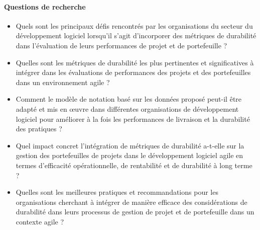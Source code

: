 \paragraph{Questions de recherche}
\begin{itemize}
    \item Quels sont les principaux défis rencontrés par les organisations du secteur du développement logiciel lorsqu'il s'agit d'incorporer des métriques de durabilité dans l'évaluation de leurs performances de projet et de portefeuille ?
    \item Quelles sont les métriques de durabilité les plus pertinentes et significatives à intégrer dans les évaluations de performances des projets et des portefeuilles dans un environnement agile ?
    \item Comment le modèle de notation basé sur les données proposé peut-il être adapté et mis en œuvre dans différentes organisations de développement logiciel pour améliorer à la fois les performances de livraison et la durabilité des pratiques ?
    \item Quel impact concret l'intégration de métriques de durabilité a-t-elle sur la gestion des portefeuilles de projets dans le développement logiciel agile en termes d'efficacité opérationnelle, de rentabilité et de durabilité à long terme ?
    \item Quelles sont les meilleures pratiques et recommandations pour les organisations cherchant à intégrer de manière efficace des considérations de durabilité dans leurs processus de gestion de projet et de portefeuille dans un contexte agile ?
\end{itemize}

